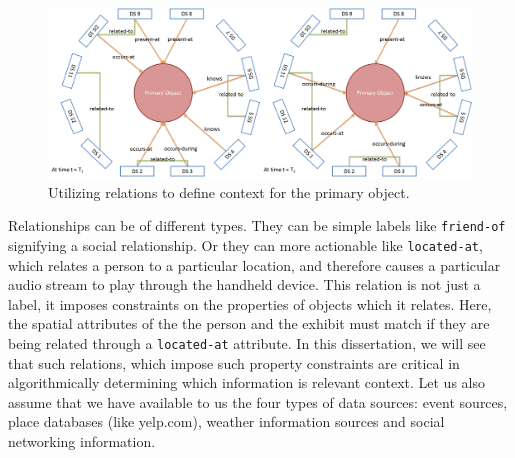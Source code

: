 \begin{figure}[t]
\centering
\includegraphics[width=\textwidth]{media/chapter2/cn.png}
\caption{Utilizing relations to define context for the primary object.}
\label{fig:cn-def}
\end{figure}

Relationships can be of different types. They can be simple labels like \texttt{friend-of} signifying a social relationship. Or they can more actionable like \texttt{located-at}, which relates a person to a particular location, and therefore causes a particular audio stream to play through the handheld device. This relation is not just a label, it imposes constraints on the properties of objects which it relates. Here, the spatial attributes of the the person and the exhibit must match if they are being related through a \texttt{located-at} attribute. In this dissertation, we will see that such relations, which impose such property constraints are critical in algorithmically determining which information is relevant context. Let us also assume that we have available to us the four types of data sources: event sources, place databases (like yelp.com), weather information sources and social networking information.


